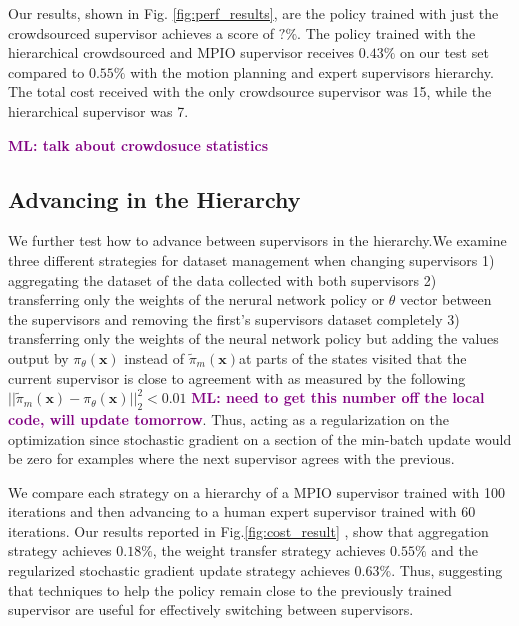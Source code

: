 \documentclass[10pt, conference]{ieeeconf}      %
\newcommand{\bx}{\mathbf{x}}
\newcommand{\mlnote}[1]{\ifthenelse{ \boolean{include-notes}}%
 {\textcolor{purple}{\textbf{ML: #1}}}{}}
\begin{document}
Our results, shown in Fig. \ref{fig:perf_results}, are the policy trained with just the crowdsourced supervisor achieves a score of $?\%$. The policy trained with the hierarchical crowdsourced and MPIO supervisor receives $0.43\%$ on our test set compared to $0.55\%$ with the motion planning and expert supervisors hierarchy. The total cost received with the only crowdsource supervisor was 15, while the hierarchical supervisor was 7. 

\mlnote{talk about crowdosuce statistics}

\subsection{Advancing in the Hierarchy}
We further test how to advance between supervisors in the hierarchy.We examine three different strategies for dataset management when changing supervisors 1) aggregating the dataset of the data collected with both supervisors 2) transferring only the weights of the nerural network policy or $\theta$ vector between the supervisors and removing the first's supervisors dataset completely 3) transferring only the weights of the neural network policy but adding the values output by $\pi_\theta(\bx)$  instead of $\tilde{\pi}_m(\bx)$at parts of the states visited that the current supervisor is close to agreement with as measured by the following $||\tilde{\pi}_m(\bx) - \pi_\theta(\bx)||^2_2 < 0.01$ \mlnote{need to get this number off the local code, will update tomorrow}. Thus, acting as a regularization on the optimization since stochastic gradient on a section of the min-batch update would be zero for examples where the next supervisor agrees with the previous. 


We compare each strategy on a hierarchy of a MPIO supervisor trained with 100 iterations and then advancing to a human expert supervisor trained with 60 iterations.  Our results reported in Fig.\ref{fig:cost_result} , show that aggregation strategy achieves $0.18\%$, the weight transfer strategy achieves $0.55\%$ and the regularized stochastic gradient update strategy achieves $0.63\%$. Thus, suggesting that techniques to help the policy remain close to the previously trained supervisor are useful for effectively switching between supervisors.   
\end{document}
